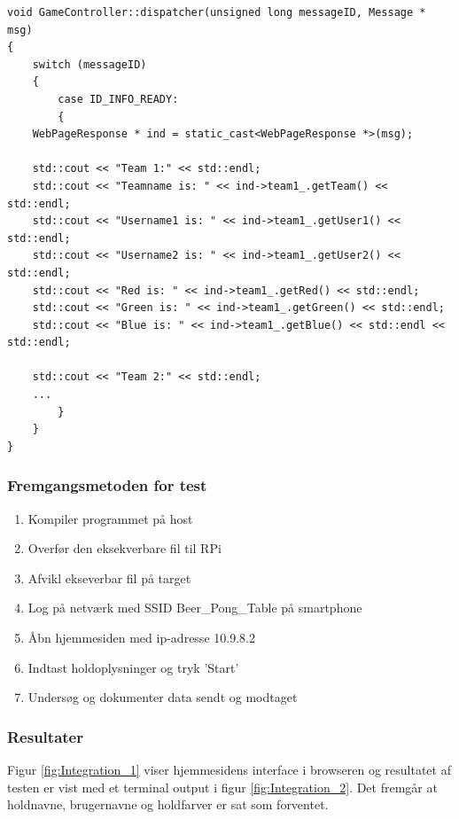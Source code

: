 \documentclass[Integrationstest/Integrationstest_main.tex]{subfiles}
\begin{document}
\begin{lstlisting}
void GameController::dispatcher(unsigned long messageID, Message * msg)
{
    switch (messageID) 
    {
        case ID_INFO_READY:
        {
	WebPageResponse * ind = static_cast<WebPageResponse *>(msg);

	std::cout << "Team 1:" << std::endl;
	std::cout << "Teamname is: " << ind->team1_.getTeam() << std::endl;
	std::cout << "Username1 is: " << ind->team1_.getUser1() << std::endl;
	std::cout << "Username2 is: " << ind->team1_.getUser2() << std::endl;
	std::cout << "Red is: " << ind->team1_.getRed() << std::endl;
	std::cout << "Green is: " << ind->team1_.getGreen() << std::endl;
	std::cout << "Blue is: " << ind->team1_.getBlue() << std::endl << std::endl;

	std::cout << "Team 2:" << std::endl;
	...
    	}
    }
}
\end{lstlisting}

\subsubsection{Fremgangsmetoden for test}
\begin{enumerate}
    \item Kompiler programmet på host
    \item Overfør den eksekverbare fil til RPi 
    \item Afvikl ekseverbar fil på target
    \item Log på netværk med SSID Beer\_Pong\_Table på smartphone
    \item Åbn hjemmesiden med ip-adresse 10.9.8.2
    \item Indtast holdoplysninger og tryk 'Start'
    \item Undersøg og dokumenter data sendt og modtaget 
\end{enumerate}

\subsubsection{Resultater}
Figur \ref{fig:Integration_1} viser hjemmesidens interface i browseren og resultatet af testen er vist med et terminal output i figur \ref{fig:Integration_2}. Det fremgår at holdnavne, brugernavne og holdfarver er sat som forventet.
\end{document}
